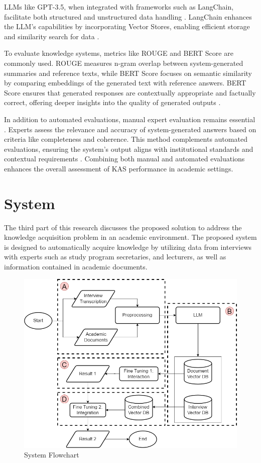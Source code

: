 \documentclass[runningheads]{llncs}
\begin{document}
LLMs like GPT-3.5, when integrated with frameworks such as LangChain, facilitate both structured and unstructured data handling  \cite{deepLearning2023LangChain}. LangChain enhances the LLM’s capabilities by incorporating Vector Stores, enabling efficient storage and similarity search for data \cite{Manning2008}.

To evaluate knowledge systems, metrics like ROUGE \cite{Lin2004} and BERT Score \cite{Zhang2020} are commonly used. ROUGE measures n-gram overlap between system-generated summaries and reference texts, while BERT Score focuses on semantic similarity by comparing embeddings of the generated text with reference answers. BERT Score ensures that generated responses are contextually appropriate and factually correct, offering deeper insights into the quality of generated outputs \cite{Goyal2020}.

In addition to automated evaluations, manual expert evaluation remains essential \cite{Guo2024}. Experts assess the relevance and accuracy of system-generated answers based on criteria like completeness and coherence. This method complements automated evaluations, ensuring the system's output aligns with institutional standards and contextual requirements \cite{Celikyilmaz2020}. Combining both manual and automated evaluations enhances the overall assessment of KAS performance in academic settings.

\section{System}
The third part of this research discusses the proposed solution to address the knowledge acquisition problem in an academic environment. The proposed system is designed to automatically acquire knowledge by utilizing data from interviews with experts such as study program secretaries, and lecturers, as well as information contained in academic documents. 

\begin{figure}
    \centerline{\includegraphics[scale=0.3]{eng-main.png}}
    \caption{System Flowchart}
    \label{fig:main-flowchart}
\end{figure}
\end{document}
